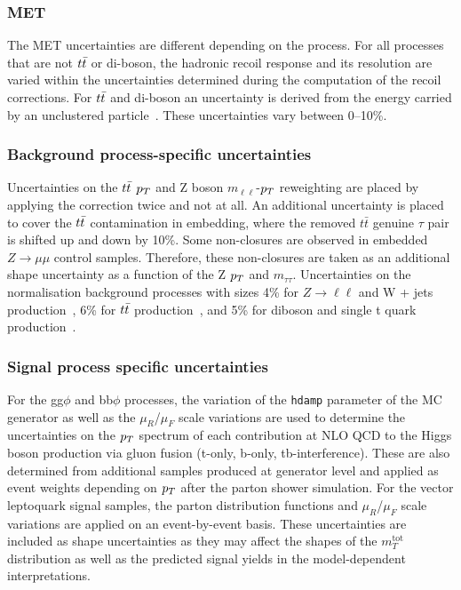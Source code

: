 \subsubsection{MET}
The \ac{MET} uncertainties are different depending on the process.
For all processes that are not $t\bar{t}$ or di-boson, the hadronic recoil response and its resolution are varied within the uncertainties determined during the computation of the recoil corrections.
For $t\bar{t}$ and di-boson an uncertainty is derived from the energy carried by an unclustered particle~\cite{Sirunyan:2019kia}.
These uncertainties vary between 0--10\%.

\subsubsection{Background process-specific uncertainties}
Uncertainties on the $t\bar{t}$ $p_{T}$ and Z boson $m_{\ell\ell}$-$p_{T}$ reweighting are placed by applying the correction twice and not at all.
An additional uncertainty is placed to cover the $t\bar{t}$ contamination in embedding, where the removed $t\bar{t}$ genuine $\tau$ pair is shifted up and down by 10\%.
Some non-closures are observed in embedded $Z\to\mu\mu$ control samples. 
Therefore, these non-closures are taken as an additional shape uncertainty as a function of the Z $p_{T}$ and $m_{\tau\tau}$.
Uncertainties on the normalisation background processes with sizes 4\% for $Z\rightarrow \ell\ell$ and W + jets production~\cite{Melnikov:2006kv}, 6\% for $t\bar{t}$ production~\cite{Czakon:2011xx,Kidonakis:2013zqa}, and 5\% for diboson and single t quark production~\cite{Kidonakis:2013zqa,Campbell:2011bn,Gehrmann:2014fva}.

\subsubsection{Signal process specific uncertainties}
For the gg$\phi$ and bb$\phi$ processes, the variation of the \texttt{hdamp} parameter of the \POWHEG \ac{MC} generator as well as the $\mu_{R}$/$\mu_{F}$ scale variations are used to determine the uncertainties on the $p_{T}$ spectrum of each contribution at NLO QCD to the Higgs boson production via gluon fusion (t-only, b-only, tb-interference). 
These are also determined from additional samples produced at generator level and applied as event weights depending on $p_{T}$ after the parton shower simulation.
For the vector leptoquark signal samples, the parton distribution functions and $\mu_{R}$/$\mu_{F}$ scale variations are applied on an event-by-event basis.
These uncertainties are included as shape uncertainties as they may affect the shapes of the $m_{T}^{\text{tot}}$ distribution as well as the predicted signal yields in the model-dependent interpretations.

